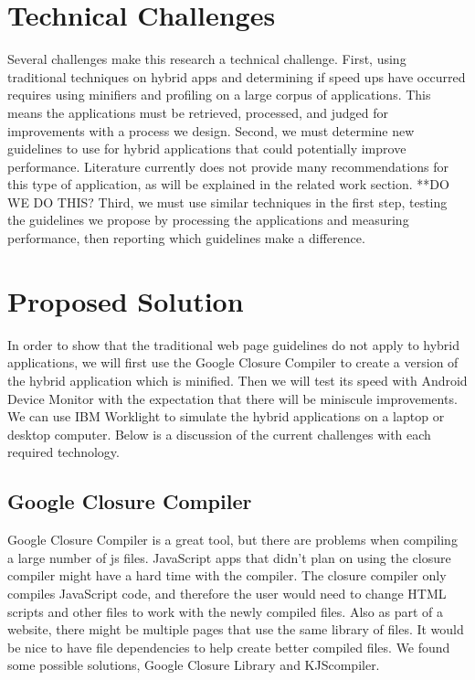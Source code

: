 \documentclass{acm_proc_article-sp}
\begin{document}
\section{Technical Challenges}
Several challenges make this research a technical challenge. First, using traditional techniques on hybrid apps and determining if speed ups have occurred requires using minifiers and profiling on a large corpus of applications. This means the applications must be retrieved, processed, and judged for improvements with a process we design. Second, we must determine new guidelines to use for hybrid applications that could potentially improve performance. Literature currently does not provide many recommendations for this type of application, as will be explained in the related work section. **DO WE DO THIS? Third, we must use similar techniques in the first step, testing the guidelines we propose by processing the applications and measuring performance, then reporting which guidelines make a difference.


\section{Proposed Solution}
In order to show that the traditional web page guidelines do not apply to hybrid applications, we will first use the Google Closure Compiler to create a version of the hybrid application which is minified. Then we will test its speed with Android Device Monitor with the expectation that there will be miniscule improvements. We can use IBM Worklight to simulate the hybrid applications on a laptop or desktop computer. Below is a discussion of the current challenges with each required technology.


\subsection{Google Closure Compiler}
Google Closure Compiler is a great tool, but there are problems when compiling a large number of js files. JavaScript apps that didn’t plan on using the closure compiler might have a hard time with the compiler. The closure compiler only compiles JavaScript code, and therefore the user would need to change HTML scripts and other files to work with the newly compiled files. Also as part of a website, there might be multiple pages that use the same library of files. It would be nice to have file dependencies to help create better compiled files. We found some possible solutions, Google Closure Library and KJScompiler.
\end{document}
